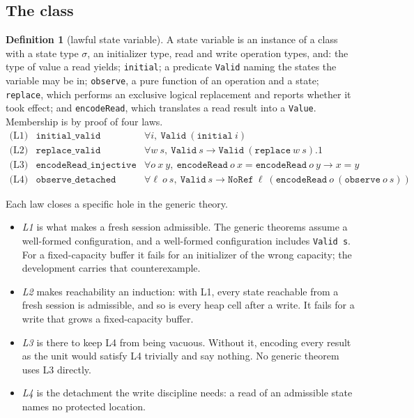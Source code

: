 \documentclass[11pt,a4paper]{article}
\theoremstyle{definition}
\newtheorem{definition}{Definition}[section]
\theoremstyle{plain}
\newcommand{\code}[1]{\texttt{#1}}
\begin{document}
\subsection{The class}

\begin{definition}[lawful state variable]\label{def:lawful}
A state variable is an instance of a class with a state type $\sigma$, an
initializer type, read and write operation types, and: the type of value a read
yields; \code{initial}; a predicate \code{Valid} naming the states the variable
may be in; \code{observe}, a pure function of an operation and a state;
\code{replace}, which performs an exclusive logical replacement and reports
whether it took effect; and \code{encodeRead}, which translates a read result
into a \code{Value}. Membership is by proof of four laws.
\[
\begin{array}{rll}
\text{(L1)} & \code{initial\_valid} & \forall i,\ \code{Valid}\ (\code{initial}\ i) \\
\text{(L2)} & \code{replace\_valid} & \forall w\ s,\ \code{Valid}\ s \to \code{Valid}\ (\code{replace}\ w\ s).1 \\
\text{(L3)} & \code{encodeRead\_injective} & \forall o\ x\ y,\ \code{encodeRead}\ o\ x = \code{encodeRead}\ o\ y \to x = y \\
\text{(L4)} & \code{observe\_detached} & \forall \ell\ o\ s,\ \code{Valid}\ s \to \code{NoRef}\ \ell\ (\code{encodeRead}\ o\ (\code{observe}\ o\ s))
\end{array}
\]
\end{definition}

Each law closes a specific hole in the generic theory.

\begin{itemize}[leftmargin=1.4em,itemsep=2pt]
\item \emph{L1} is what makes a fresh session admissible. The generic theorems
assume a well-formed configuration, and a well-formed configuration includes
\code{Valid s}. For a fixed-capacity buffer it fails for an initializer of the
wrong capacity; the development carries that counterexample.
\item \emph{L2} makes reachability an induction: with L1, every state reachable
from a fresh session is admissible, and so is every heap cell after a write. It
fails for a write that grows a fixed-capacity buffer.
\item \emph{L3} is there to keep L4 from being vacuous. Without it, encoding
every result as the unit would satisfy L4 trivially and say nothing. No generic
theorem uses L3 directly.
\item \emph{L4} is the detachment the write discipline needs: a read of an
admissible state names no protected location.
\end{itemize}
\end{document}
